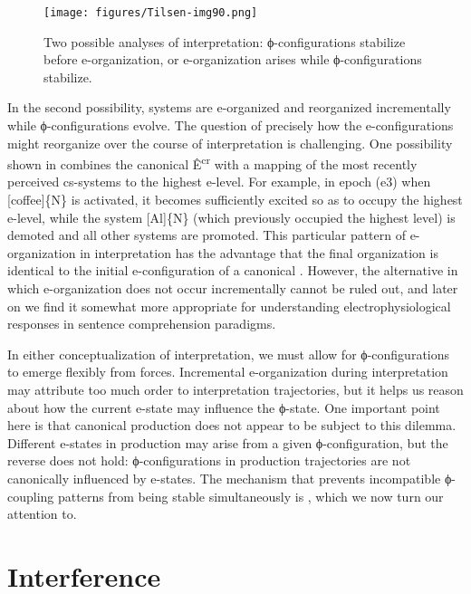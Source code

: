   
\begin{figure}
\texttt{[image: figures/Tilsen-img90.png]}
\caption{Two possible analyses of interpretation: ϕ-con\-fig\-u\-ra\-tions stabilize before e-organization, or e-organization arises while ϕ-con\-fig\-u\-ra\-tions stabilize.}
\label{fig:4:40}
\end{figure}
 

  In the second possibility, systems are e-organized and reorganized incrementally while ϕ-con\-fig\-u\-ra\-tions evolve. The question of precisely how the e-con\-fig\-u\-ra\-tions might reorganize over the course of interpretation is challenging. One possibility shown in {} combines the canonical  Ê\textsuperscript{cr} with a mapping of the most recently perceived cs-systems to the highest e-level. For example, in epoch (e3) when [coffee]\{N\} is activated, it becomes sufficiently excited so as to occupy the highest e-level, while the system [Al]\{N\} (which previously occupied the highest level) is demoted and all other systems are promoted. This particular pattern of e-organization in interpretation has the advantage that the final organization is identical to the initial e-con\-fig\-u\-ra\-tion of a canonical . However, the alternative in which e-or\-ga\-ni\-za\-tion does not occur incrementally cannot be ruled out, and later on we find it somewhat more appropriate for understanding electrophysiological responses in sentence comprehension paradigms.

  In either conceptualization of interpretation, we must allow for ϕ-con\-fig\-u\-ra\-tions to emerge flexibly from  forces. Incremental e-organization during interpretation may attribute too much order to interpretation trajectories, but it helps us reason about how the current e-state may influence the ϕ-state. One important point here is that canonical production does not appear to be subject to this dilemma. Different e-states in production may arise from a given ϕ-con\-fig\-u\-ra\-tion, but the reverse does not hold: ϕ-con\-fig\-u\-ra\-tions in production trajectories are not canonically influenced by e-states. The mechanism that prevents incompatible ϕ-coupling patterns from being stable simultaneously is , which we now turn our attention to.

\section{Interference}

